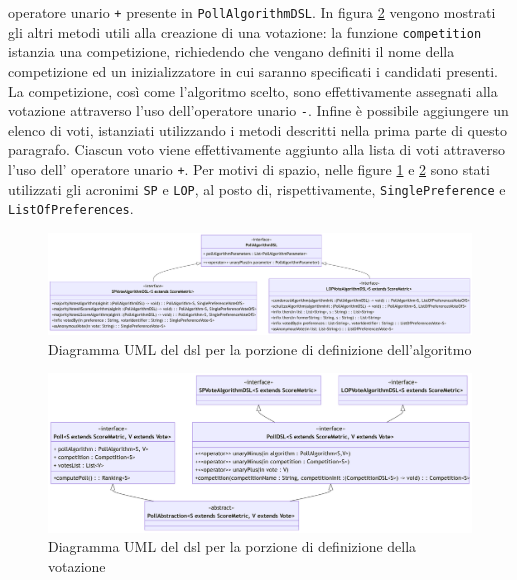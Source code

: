 \documentclass[12pt,a4paper,openright,twoside]{book}
\begin{document}
operatore unario \texttt{+} presente in \texttt{PollAlgorithmDSL}.
In figura \ref{fig:pollDSL} vengono mostrati gli altri metodi utili alla creazione di una votazione:
la funzione \texttt{competition} istanzia una competizione,
richiedendo che vengano definiti il nome della competizione ed un inizializzatore in cui saranno specificati i candidati presenti.
La competizione, così come l'algoritmo scelto, sono effettivamente assegnati alla votazione
attraverso l'uso dell'operatore unario \texttt{-}.
Infine è possibile aggiungere un elenco di voti, istanziati utilizzando i metodi descritti nella prima parte
di questo paragrafo. Ciascun voto viene effettivamente aggiunto alla lista di voti attraverso
l'uso dell' operatore unario \texttt{+}.
Per motivi di spazio, nelle figure \ref{fig:pollAlgorithmDSL} e \ref{fig:pollDSL} sono stati utilizzati gli
acronimi \texttt{SP} e \texttt{LOP}, al posto di, rispettivamente, \texttt{SinglePreference} e \texttt{ListOfPreferences}.

 \vfill
 \begin{center} 
 \begin{figure}[H]
     \centering
      \includegraphics[width=1.1\linewidth]{figures/pollAlgorithmDSL.pdf}
      \caption{Diagramma UML del \ac{dsl} per la porzione di definizione dell'algoritmo}
     \label{fig:pollAlgorithmDSL}
  \end{figure}
\end{center}
\vfill



\vfill
\begin{center}
 \begin{figure}[H]
     \centering
      \includegraphics[width=1.1\linewidth]{figures/pollDSL.pdf}
      \caption{Diagramma UML del \ac{dsl} per la porzione di definizione della votazione}
     \label{fig:pollDSL}
  \end{figure}
\end{center}
\vfill
  
\end{document}
